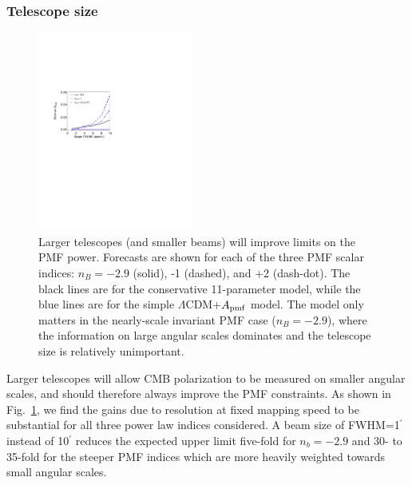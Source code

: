 \documentclass[apj]{emulateapj}
\newcommand{\apmf}{\ensuremath{A_{\rm pmf}}}
\newcommand{\lcdm}{\ensuremath{\Lambda}CDM}
\begin{document}
\subsubsection{Telescope size}


\begin{figure}[htb]\centering
\includegraphics[width=0.45\textwidth,clip,trim={1.5cm 12.5cm 11cm 7.5cm}]{pmf_beam.pdf}
  \caption[]{ \label{fig:beam}
 Larger telescopes (and smaller beams) will improve limits on the PMF power. 
 Forecasts are shown for each of the three PMF scalar indices: $n_B = -2.9$ (solid), -1 (dashed), and +2 (dash-dot). 
  The black lines are for the conservative 11-parameter model, while the blue lines are for the simple \lcdm{}+\apmf{} model. 
  The model only matters in the nearly-scale invariant PMF case ($n_B=-2.9$), where the information on large angular scales dominates and the telescope size is relatively unimportant. 
    }
\end{figure}

Larger telescopes will allow CMB polarization to be measured on smaller angular scales, and should therefore always improve the PMF constraints. 
As shown in Fig.~\ref{fig:beam}, we find the gains due to resolution at fixed mapping speed to be substantial for all three power law indices considered.
 A beam size of FWHM=1$^\prime$ instead of 10$^\prime$ reduces the expected upper limit five-fold for $n_b=-2.9$ and 30- to 35-fold for the steeper PMF indices which are more heavily weighted towards small angular scales. 
\end{document}

